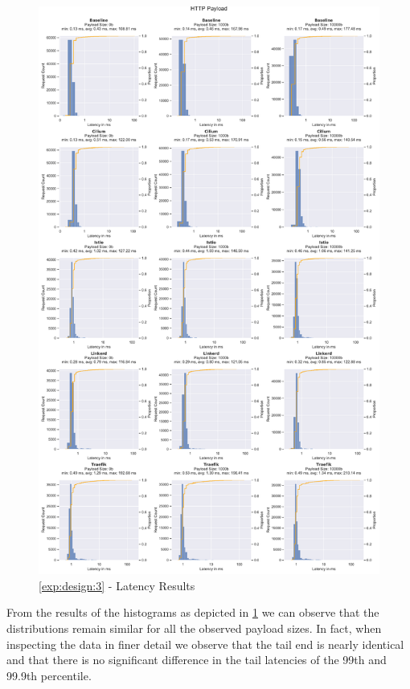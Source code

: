 \begin{figure}[!t]
    \centering
    
    \includegraphics[width=\textwidth,height=\textheight]{5_experimental_evaluation/figures/exp_03-latency-results.pdf}

    \caption{\ref{exp:design:3} - Latency Results}
    
    \label{fig:exp:result:03:latency}
\end{figure}


From the results of the histograms as depicted in \cref{fig:exp:result:03:latency} we can observe that the distributions remain similar for all the observed payload sizes. In fact, when inspecting the data in finer detail we observe that the tail end is nearly identical and that there is no significant difference in the tail latencies of the 99th and 99.9th percentile. 


